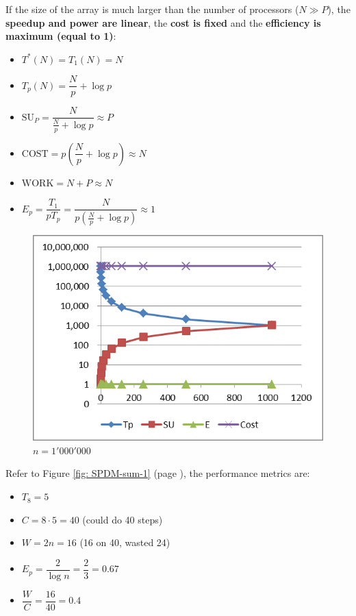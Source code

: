 \newpage

\noindent
If the size of the array is much larger than the number of processors ($N \gg P$), the \textbf{speedup and power are linear}, the \textbf{cost is fixed} and the \textbf{efficiency is maximum (equal to 1)}:
\begin{itemize}
    \item $T^{*}\left(N\right) = T_{1}\left(N\right) = N$
    \item $T_{p}\left(N\right) = \dfrac{N}{p} + \log p$
    \item $\mathrm{SU}_{P} = \dfrac{N}{\frac{N}{p}+\log p} \approx P$
    \item $\text{COST} = p\left(\dfrac{N}{p} + \log p\right) \approx N$
    \item $\text{WORK} = N + P \approx N$
    \item $E_{p} = \dfrac{T_{1}}{pT_{p}} = \dfrac{N}{p\left(\frac{N}{p} + \log p\right)} \approx 1$
\end{itemize}
\begin{figure}[!htp]
    \centering
    \includegraphics[width=.5\linewidth]{img/SPDM-sum-4.png}
    \caption*{$n = 1'000'000$}
\end{figure}

\begin{examplebox}
    Refer to Figure \ref{fig: SPDM-sum-1} (page \pageref{fig: SPDM-sum-1}), the performance metrics are:
    \begin{itemize}
        \item $T_{8} = 5$
        \item $C = 8 \cdot 5 = 40$ (could do 40 steps)
        \item $W = 2n = 16$ (16 on 40, wasted 24)
        \item $E_{p} = \dfrac{2}{\log n} = \dfrac{2}{3} = 0.67$
        \item $\dfrac{W}{C} = \dfrac{16}{40} = 0.4$
    \end{itemize}
\end{examplebox}